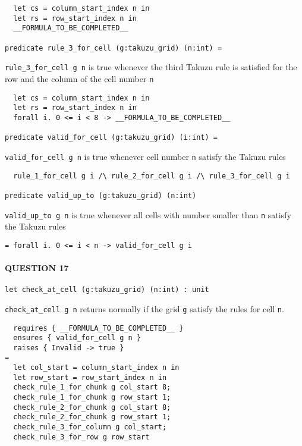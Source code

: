 \begin{verbatim}
  let cs = column_start_index n in
  let rs = row_start_index n in
  __FORMULA_TO_BE_COMPLETED__

predicate rule_3_for_cell (g:takuzu_grid) (n:int) =
\end{verbatim}

\texttt{rule\_3\_for\_cell\ g\ n} is true whenever the third Takuzu rule
is satisfied for the row and the column of the cell number \texttt{n}

\begin{verbatim}
  let cs = column_start_index n in
  let rs = row_start_index n in
  forall i. 0 <= i < 8 -> __FORMULA_TO_BE_COMPLETED__

predicate valid_for_cell (g:takuzu_grid) (i:int) =
\end{verbatim}

\texttt{valid\_for\_cell\ g\ n} is true whenever cell number \texttt{n}
satisfy the Takuzu rules

\begin{verbatim}
  rule_1_for_cell g i /\ rule_2_for_cell g i /\ rule_3_for_cell g i

predicate valid_up_to (g:takuzu_grid) (n:int)
\end{verbatim}

\texttt{valid\_up\_to\ g\ n} is true whenever all cells with number
smaller than \texttt{n} satisfy the Takuzu rules

\begin{verbatim}
= forall i. 0 <= i < n -> valid_for_cell g i
\end{verbatim}

\hypertarget{question-17}{%
\paragraph{QUESTION 17}\label{question-17}}

\begin{verbatim}
let check_at_cell (g:takuzu_grid) (n:int) : unit
\end{verbatim}

\texttt{check\_at\_cell\ g\ n} returns normally if the grid \texttt{g}
satisfy the rules for cell \texttt{n}.

\begin{verbatim}
  requires { __FORMULA_TO_BE_COMPLETED__ }
  ensures { valid_for_cell g n }
  raises { Invalid -> true }
=
  let col_start = column_start_index n in
  let row_start = row_start_index n in
  check_rule_1_for_chunk g col_start 8;
  check_rule_1_for_chunk g row_start 1;
  check_rule_2_for_chunk g col_start 8;
  check_rule_2_for_chunk g row_start 1;
  check_rule_3_for_column g col_start;
  check_rule_3_for_row g row_start
\end{verbatim}

